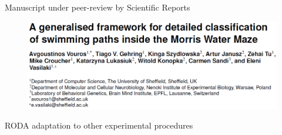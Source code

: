 \documentclass{beamer}
\begin{document}
{\begin{frame}{Manuscript under peer-review by Scientific Reports}	
	\begin{figure}[H]
		\centering
		\includegraphics[width=\textwidth]{figures/paper}
	\end{figure}
\end{frame}


\begin{frame}[plain,c]
\begin{center}
	\Huge RODA adaptation to other experimental procedures
\end{center}
\end{frame}

}
\end{document}
